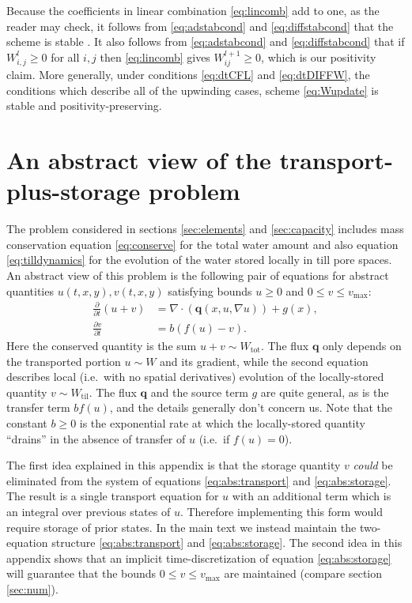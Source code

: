 \documentclass[11pt,final]{amsart}
\newcommand{\Div}{\nabla\cdot}
\newcommand{\grad}{\nabla}
\newcommand{\Wtil}{W_{\text{til}}}
\newcommand{\Wtot}{W_{\text{tot}}}
\newcommand{\Wlij}{W^l_{i,j}}
\begin{document}
Because the coefficients in linear combination \eqref{eq:lincomb} add to one, as the reader may check, it follows  from \eqref{eq:adstabcond} and \eqref{eq:diffstabcond} that the scheme is stable \citep{MortonMayers}.  It also follows from \eqref{eq:adstabcond} and \eqref{eq:diffstabcond} that if $\Wlij\ge 0$ for all $i,j$ then \eqref{eq:lincomb} gives $W_{ij}^{l+1}\ge 0$, which is our positivity claim.  More generally, under conditions \eqref{eq:dtCFL} and \eqref{eq:dtDIFFW}, the conditions which describe all of the upwinding cases, scheme \eqref{eq:Wupdate} is stable and positivity-preserving.


\section{An abstract view of the transport-plus-storage problem} \label{app:transportstorage}

The problem considered in sections \ref{sec:elements} and \ref{sec:capacity} includes mass conservation equation \eqref{eq:conserve} for the total water amount and also equation \eqref{eq:tilldynamics} for the evolution of the water stored locally in till pore spaces.  An abstract view of this problem is the following pair of equations for abstract quantities $u(t,x,y),v(t,x,y)$ satisfying bounds $u\ge 0$ and $0 \le v \le v_{\text{max}}$:
\begin{align}
\frac{\partial}{\partial t} \left(u+v\right) &= \Div \left(\mathbf{q}(x,u,\grad u)\right) + g(x), \label{eq:abs:transport} \\
   \frac{\partial v}{\partial t} &= b \left(f(u) - v\right).  \label{eq:abs:storage}
\end{align}
Here the conserved quantity is the sum $u+v \sim \Wtot$.  The flux $\mathbf{q}$ only depends on the transported portion $u \sim W$ and its gradient, while the second equation describes local (i.e.~with no spatial derivatives) evolution of the locally-stored quantity $v \sim \Wtil$.  The flux $\mathbf{q}$ and the source term $g$ are quite general, as is the transfer term $b f(u)$, and the details generally don't concern us.  Note that the constant $b\ge 0$ is the exponential rate at which the locally-stored quantity ``drains'' in the absence of transfer of $u$ (i.e.~if $f(u)=0$).

The first idea explained in this appendix is that the storage quantity $v$ \emph{could} be eliminated from the system of equations \eqref{eq:abs:transport} and \eqref{eq:abs:storage}.  The result is a single transport equation for $u$ with an additional term which is an integral over previous states of $u$.  Therefore implementing this form would require storage of prior states.  In the main text we instead maintain the two-equation structure  \eqref{eq:abs:transport} and \eqref{eq:abs:storage}.  The second idea in this appendix shows that an implicit time-discretization of equation \eqref{eq:abs:storage} will guarantee that the bounds $0 \le v \le v_{\text{max}}$ are maintained (compare section \ref{sec:num}).   
\end{document}
